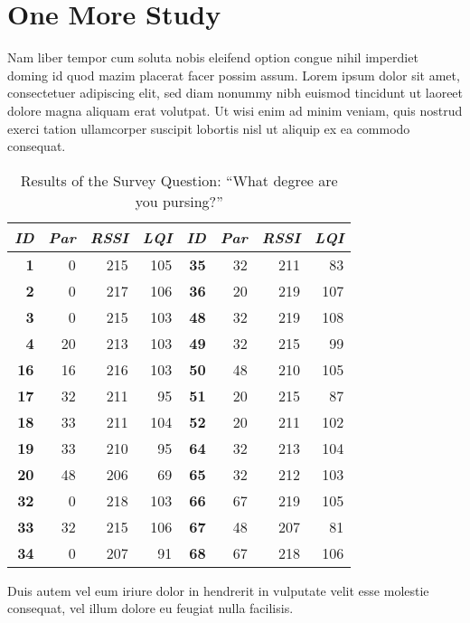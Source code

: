\section{One More Study}
Nam liber tempor cum soluta nobis eleifend option congue nihil imperdiet doming
id quod mazim placerat facer possim assum. Lorem ipsum dolor sit amet,
consectetuer adipiscing elit, sed diam nonummy nibh euismod tincidunt ut laoreet
dolore magna aliquam erat volutpat. Ut wisi enim ad minim veniam, quis nostrud
exerci tation ullamcorper suscipit lobortis nisl ut aliquip ex ea commodo
consequat.

\begin{table}
\begin{center}
\begin{tabular}{|r|r|r|r||r|r|r|r|}
\hline \textbf{\textit{ID}} & \textbf{\textit{Par}} & \textbf{\textit{RSSI}} &
\textbf{\textit{LQI}} &
\textbf{\textit{ID}} & \textbf{\textit{Par}} & \textbf{\textit{RSSI}} & \textbf{\textit{LQI}} \\
\hline \hline
\textbf{1}  &  0 & 215 & 105 & \textbf{35} & 32 & 211 &  83 \\
\textbf{2}  &  0 & 217 & 106 & \textbf{36} & 20 & 219 & 107 \\
\textbf{3}  &  0 & 215 & 103 & \textbf{48} & 32 & 219 & 108 \\
\textbf{4}  & 20 & 213 & 103 & \textbf{49} & 32 & 215 &  99 \\
\textbf{16} & 16 & 216 & 103 & \textbf{50} & 48 & 210 & 105 \\
\textbf{17} & 32 & 211 &  95 & \textbf{51} & 20 & 215 &  87 \\
\textbf{18} & 33 & 211 & 104 & \textbf{52} & 20 & 211 & 102 \\
\textbf{19} & 33 & 210 &  95 & \textbf{64} & 32 & 213 & 104 \\
\textbf{20} & 48 & 206 &  69 & \textbf{65} & 32 & 212 & 103 \\
\textbf{32} &  0 & 218 & 103 & \textbf{66} & 67 & 219 & 105 \\
\textbf{33} & 32 & 215 & 106 & \textbf{67} & 48 & 207 &  81 \\
\textbf{34} &  0 & 207 &  91 & \textbf{68} & 67 & 218 & 106 \\
\hline
\end{tabular}
\caption{Results of the Survey Question: ``What degree are you pursing?''}
\end{center}
\end{table}

Duis autem vel eum iriure dolor in hendrerit in vulputate velit esse molestie
consequat, vel illum dolore eu feugiat nulla facilisis.

